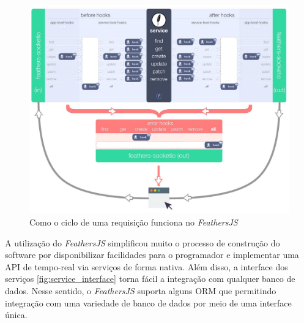 \begin{figure}
  \centering
  \includegraphics[scale=0.45,valign=t]{imagens/feathers_request.jpeg}
  \caption{Como o ciclo de uma requisição funciona no \textit{FeathersJS}}
  \label{fig:feathers_request}
\end{figure}

A utilização do \textit{FeathersJS} simplificou muito o processo de construção
do software por disponibilizar facilidades para o programador e implementar
uma API de tempo-real via serviços de forma nativa. Além disso, a interface dos
serviços \autoref{fig:service_interface} torna fácil a integração com qualquer banco de dados.
Nesse sentido, o \textit{FeathersJS} suporta alguns ORM que permitindo integração
com uma variedade de banco de dados por meio de uma interface única.
